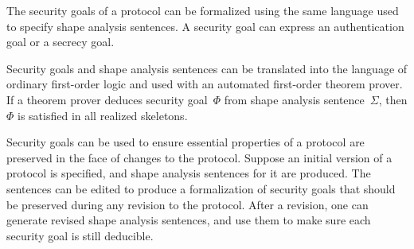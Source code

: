\documentclass[12pt]{report}
\theoremstyle{definition}
\begin{document}
The security goals of a protocol can be formalized using the same
language used to specify shape analysis sentences.  A security goal
can express an authentication goal or a secrecy goal.

Security goals and shape analysis sentences can be translated into the
language of ordinary first-order logic and used with an automated
first-order theorem prover.  If a theorem prover deduces security
goal~$\Phi$ from shape analysis sentence~$\Sigma$, then $\Phi$ is
satisfied in all realized skeletons.

Security goals can be used to ensure essential properties of a
protocol are preserved in the face of changes to the protocol.
Suppose an initial version of a protocol is specified, and shape
analysis sentences for it are produced.  The sentences can be edited
to produce a formalization of security goals that should be preserved
during any revision to the protocol.  After a revision, one can
generate revised shape analysis sentences, and use them to make sure
each security goal is still deducible.




\printindex
\end{document}
